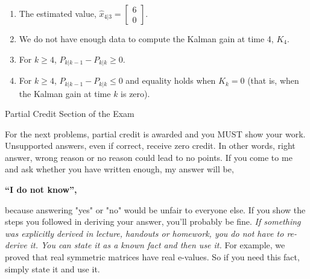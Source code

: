 \documentclass[letterpaper]{article}
\begin{document}
\begin{enumerate}
\begin{enumerate}
	    \renewcommand{\labelenumi}{(\alph{enumi})}
	    \setlength{\itemsep}{.1in}
	    \item The estimated value, $\hat{x}_{4|3} = \begin{bmatrix} 6 \\ 0\end{bmatrix}$.
	    \item We do not have enough data to compute the Kalman gain at time 4, $K_4$.
	    \item  For $k\ge 4$, $P_{k|k-1} - P_{k|k} \geq 0$.
	    \item For $k\ge 4$, $P_{k|k-1} - P_{k|k} \leq 0$ and equality holds when $K_k = 0$ (that is, when the Kalman gain at time $k$ is zero).
	
	\end{enumerate}
	
\end{enumerate}

%
%
%
%
%


\newpage

\vspace*{.7in}
\begin{center}
\huge

Partial Credit Section of the Exam

\end{center}



\vspace*{1in}

{\Large  For the next problems, partial credit is awarded and you MUST show your work. Unsupported answers, even if correct, receive zero credit. In other words, right answer, wrong
reason or no reason could lead to no points. If you come to me and ask whether you have written enough, my answer will be,
\begin{center}
\bf ``I do not know'',
\end{center}
 because answering "yes" or "no"  would be unfair to everyone else. If you show the steps you followed in deriving your answer, you'll probably be fine.
  \emph{If something was explicitly derived in lecture, handouts or homework, you do not have to re-derive it. You can state it as a known fact and then use it.} For example, we proved that real symmetric matrices have real e-values. So if you need this fact, simply state it and use it.}
\end{document}
